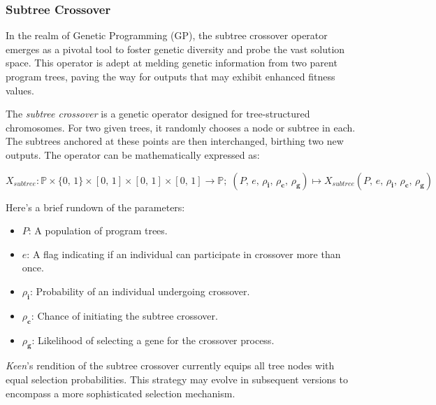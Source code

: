\subsubsection{Subtree Crossover}
\label{sec:keen:gp:op:cx:subtree}
  In the realm of Genetic Programming (GP), the subtree crossover operator
  emerges as a pivotal tool to foster genetic diversity and probe the vast 
  solution space. This operator is adept at melding genetic information from 
  two parent program trees, paving the way for outputs that may exhibit 
  enhanced fitness values.

  \begin{definition}
    The \textit{subtree crossover} is a genetic operator designed for 
    tree-structured chromosomes. For two given trees, it randomly chooses a 
    node or subtree in each. The subtrees anchored at these points are then 
    interchanged, birthing two new outputs. The operator can be mathematically 
    expressed as:

    \begin{equation}
      X_{subtree}: \mathbb{P} \times \{0,\, 1\} \times [0,\, 1] 
        \times [0,\, 1] \times [0,\, 1] \to \mathbb{P};\;
        (P,\, e,\, \rho_\mathbf{i},\, \rho_\mathbf{c},\, \rho_\mathbf{g}) 
        \mapsto X_{subtree}(P,\, e,\, \rho_\mathbf{i},\, \rho_\mathbf{c},\, \rho_\mathbf{g})
    \end{equation}

    Here's a brief rundown of the parameters:

    \begin{itemize}
      \item \(P\): A population of program trees.
      \item \(e\): A flag indicating if an individual can participate in 
        crossover more than once.
      \item \(\rho_\mathbf{i}\): Probability of an individual undergoing 
        crossover.
      \item \(\rho_\mathbf{c}\): Chance of initiating the subtree crossover.
      \item \(\rho_\mathbf{g}\): Likelihood of selecting a gene for the 
        crossover process.
    \end{itemize}
  \end{definition}

  \begin{remark}
    \textit{Keen}'s rendition of the subtree crossover currently equips all 
    tree nodes with equal selection probabilities. This strategy may evolve 
    in subsequent versions to encompass a more sophisticated selection 
    mechanism.
  \end{remark}

